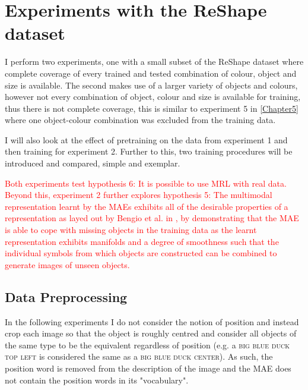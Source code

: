 \section{Experiments with the ReShape dataset}
I perform two experiments, one with a small subset of the ReShape dataset where complete coverage of every trained and tested combination of colour, object and size is available. The second makes use of a larger variety of objects and colours, however not every combination of object, colour and size is available for training, thus there is not complete coverage, this is similar to experiment 5 in \autoref{Chapter5} where one object-colour combination was excluded from the training data. 

I will also look at the effect of pretraining on the data from experiment 1 and then training for experiment 2. Further to this, two training procedures will be introduced and compared, simple and exemplar.

\textcolor{red}{Both experiments test hypothesis 6: It is possible to use \ac{MRL} with real data. Beyond this, experiment 2 further explores hypothesis 5: The multimodal representation learnt by the \acp{MAE} exhibits all of the desirable properties of a representation as layed out by Bengio et al. in \cite{repRev}, by demonstrating that the \ac{MAE} is able to cope with missing objects in the training data as the learnt representation exhibits manifolds and a degree of smoothness such that the individual symbols from which objects are constructed can be combined to generate images of unseen objects.}

\subsection{Data Preprocessing}

In the following experiments I do not consider the notion of position and instead crop each image so that the object is roughly centred and consider all objects of the same type to be the equivalent regardless of position (e.g. a \textsc{big blue duck top left} is considered the same as a \textsc{big blue duck center}). As such, the position word is removed from the description of the image and the \ac{MAE} does not contain the position words in its "vocabulary".

